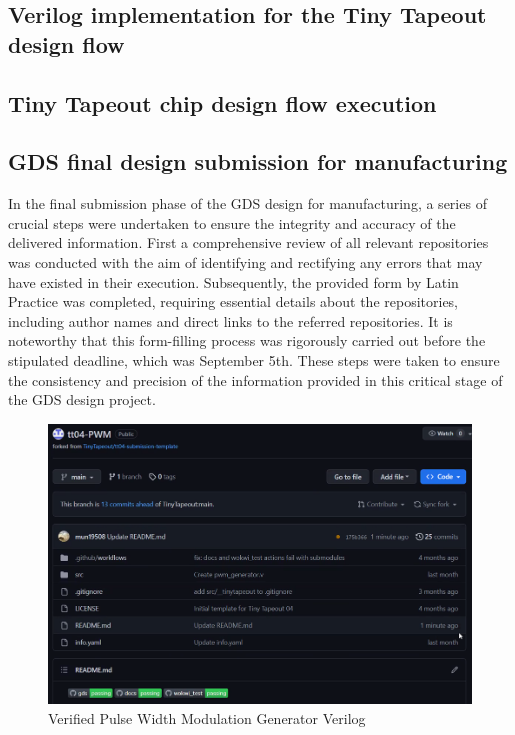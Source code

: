 \subsection{Verilog implementation for the Tiny Tapeout design flow}

\subsection{Tiny Tapeout chip design flow execution}

\subsection{GDS final design submission for manufacturing}
In the final submission phase of the GDS design for manufacturing, a series of crucial steps were undertaken to ensure the integrity and accuracy of the delivered information. First a comprehensive review of all relevant repositories was conducted with the aim of identifying and rectifying any errors that may have existed in their execution. Subsequently, the provided form by Latin Practice was completed, requiring essential details about the repositories, including author names and direct links to the referred repositories. It is noteworthy that this form-filling process was rigorously carried out before the stipulated deadline, which was September 5th. These steps were taken to ensure the consistency and precision of the information provided in this critical stage of the GDS design project.

\begin{figure}[H]
    \centering
    \includegraphics[width=\linewidth]{Pictures/pwm_verified.png}
    \caption{Verified Pulse Width Modulation Generator Verilog }\label{fig:enter-label1}
\end{figure}

